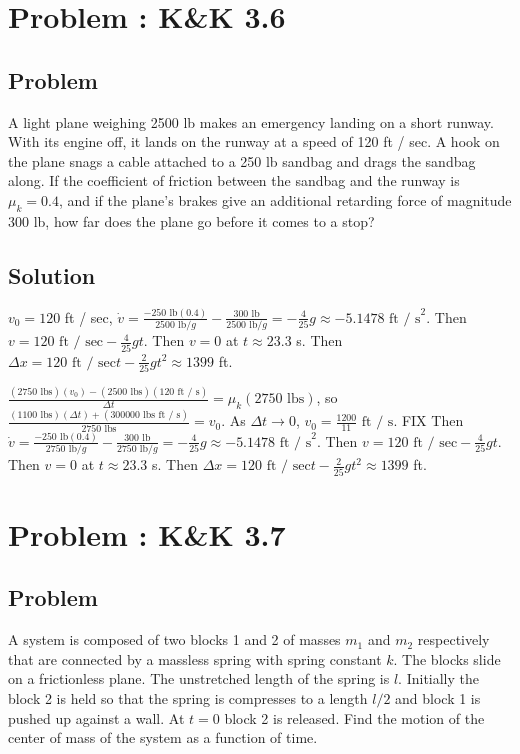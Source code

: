 \documentclass[solutions]{esg8012pset}
\begin{document}
\section{Problem \thesection: K\&K 3.6}
\subsection{Problem}
  A light plane weighing 2500 lb makes an emergency landing on a short runway. With its engine off, it lands on the runway at a speed of 120 ft / sec. A hook on the plane snags a cable attached to a 250 lb sandbag and drags the sandbag along. If the coefficient of friction between the sandbag and the runway is $\mu_k = 0.4$, and if the plane's brakes give an additional retarding force of magnitude 300 lb, how far does the plane go before it comes to a stop?
\subsection{Solution}
  $v_0 = 120$ ft / sec, $\dot v = \frac{-250\text{ lb}(0.4)}{2500\text{ lb} / g} - \frac{300\text{ lb}}{2500\text{ lb} / g} = -\frac{4}{25} g \approx -5.1478\text{ ft / s}^2$.  Then $v = 120\text{ ft / sec} -\frac{4}{25} g t$.  Then $v = 0$ at $t \approx 23.3$ s.  Then $\Delta x = 120\text{ ft / sec} t - \frac{2}{25} g t^2 \approx 1399$ ft.


   $\frac{(2750\text{ lbs})(v_0) - (2500\text{ lbs})(120\text{ ft / s})}{\Delta t} = \mu_k (2750\text{ lbs})$, so $\frac{(1100\text{ lbs})(\Delta t) + (300000\text{ lbs ft / s})}{2750\text{ lbs}} = v_0$.  As $\Delta t \longrightarrow 0$, $v_0 = \frac{1200}{11}\text{ ft / s}$.  FIX Then $\dot v = \frac{-250\text{ lb}(0.4)}{2750\text{ lb} / g} - \frac{300\text{ lb}}{2750\text{ lb} / g} = -\frac{4}{25} g \approx -5.1478\text{ ft / s}^2$.  Then $v = 120\text{ ft / sec} -\frac{4}{25} g t$.  Then $v = 0$ at $t \approx 23.3$ s.  Then $\Delta x = 120\text{ ft / sec} t - \frac{2}{25} g t^2 \approx 1399$ ft.
\section{Problem \thesection: K\&K 3.7}
\subsection{Problem}
  A system is composed of two blocks 1 and 2 of masses $m_1$ and $m_2$ respectively that are connected by a massless spring with spring constant $k$. The blocks slide on a frictionless plane. The unstretched length of the spring is $l$. Initially the block 2 is held so that the spring is compresses to a length $l / 2$ and block 1 is pushed up against a wall. At $t = 0$ block 2 is released. Find the motion of the center of mass of the system as a function of time.
\end{document}

